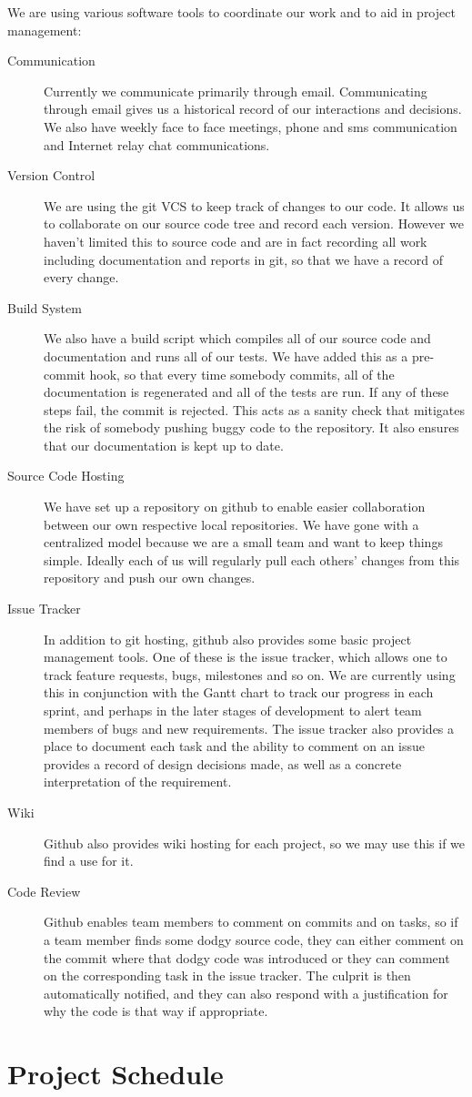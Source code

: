 \documentclass{article}
\begin{document}
We are using various software tools to coordinate our work and to aid in project management:
\begin{description}
  \item[Communication] Currently we communicate primarily through email. Communicating through email gives us a historical record of our interactions and decisions. We also have weekly face to face meetings, phone and sms communication and Internet relay chat communications.
  \item[Version Control] We are using the git VCS to keep track of changes to our code. It allows us to collaborate on our source code tree and record each version. However we haven't limited this to source code and are in fact recording all work including documentation and reports in git, so that we have a record of every change.
  \item[Build System] We also have a build script which compiles all of our source code and documentation and runs all of our tests. We have added this as a pre-commit hook, so that every time somebody commits, all of the documentation is regenerated and all of the tests are run. If any of these steps fail, the commit is rejected. This acts as a sanity check that mitigates the risk of somebody pushing buggy code to the repository. It also ensures that our documentation is kept up to date.
  \item[Source Code Hosting] We have set up a repository on github to enable easier collaboration between our own respective local repositories. We have gone with a centralized model because we are a small team and want to keep things simple. Ideally each of us will regularly pull each others' changes from this repository and push our own changes.
  \item[Issue Tracker] In addition to git hosting, github also provides some basic project management tools. One of these is the issue tracker, which allows one to track feature requests, bugs, milestones and so on. We are currently using this in conjunction with the Gantt chart to track our progress in each sprint, and perhaps in the later stages of development to alert team members of bugs and new requirements. The issue tracker also provides a place to document each task and the ability to comment on an issue provides a record of design decisions made, as well as a concrete interpretation of the requirement.
  \item[Wiki] Github also provides wiki hosting for each project, so we may use this if we find a use for it.
  \item[Code Review] Github enables team members to comment on commits and on tasks, so if a team member finds some dodgy source code, they can either comment on the commit where that dodgy code was introduced or they can comment on the corresponding task in the issue tracker. The culprit is then automatically notified, and they can also respond with a justification for why the code is that way if appropriate.
\end{description}


\appendix
\section{Project Schedule}

\end{document}
